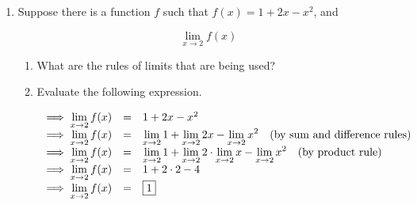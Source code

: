 \documentclass[10pt,paper=letter]{scrartcl}
\begin{document}
\begin{enumerate}[resume, label=\arabic*.,font=\bfseries]
\item Suppose there is a function $f$ such that $f(x) =1+2x-x^2$, and
    
    $$\lim_{x \rightarrow 2} {f(x)}$$
    
    \begin{enumerate}
        \item[(a)] What are the rules of limits that are being used? 
        
        
        \item[(b)] Evaluate the following expression.
        
        
        \sol 
        
        \begin{equation*}
            \begin{array}{lll}
               \implies \displaystyle \mathop {\lim }\limits_{x \rightarrow 2} {f(x)} & =  &   1 + 2x - x^2\\
                
              \implies \displaystyle \mathop {\lim }\limits_{x \rightarrow 2} {f(x)} & =  &  \displaystyle \mathop {\lim }\limits_{x \rightarrow 2} 1 + \displaystyle \mathop {\lim }\limits_{x \rightarrow 2} 2x - \displaystyle \mathop {\lim }\limits_{x \rightarrow 2} x^2 \quad (\text{by sum and difference rules})\\
              
                \implies \displaystyle \mathop {\lim }\limits_{x \rightarrow 2} {f(x)} & =  &  \displaystyle \mathop {\lim }\limits_{x \rightarrow 2} 1 + \displaystyle \mathop {\lim }\limits_{x \rightarrow 2} 2 \cdot \displaystyle \mathop {\lim }\limits_{x \rightarrow 2} x - \displaystyle \mathop {\lim }\limits_{x \rightarrow 2} x^2 \quad (\text{by product rule})\\
                
                     \implies \displaystyle \mathop {\lim }\limits_{x \rightarrow 2} {f(x)} & =  &  1 + 2\cdot2 - 4 \\
                     
                         \implies \displaystyle \mathop {\lim }\limits_{x \rightarrow 2} {f(x)} & =  &  \fbox{1} \\
            \end{array} 
        \end{equation*}
    \end{enumerate}
    

\end{enumerate}
\end{document}
